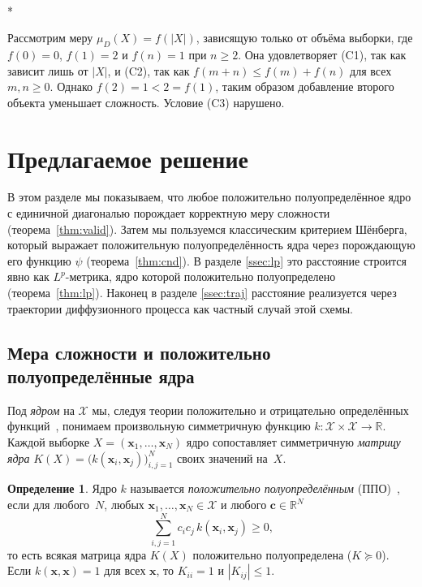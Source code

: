 \documentclass[14pt, a4paper]{extarticle}
\makeatletter
\theoremstyle{definition}
\newtheorem{definition}{Определение}[section]
\theoremstyle{plain}
\renewenvironment{proof}[1][\proofname]{\par
    \pushQED{\qed}%
    \normalfont \topsep6\p@\@plus6\p@\relax
    \trivlist
    \item[\hskip\labelsep\itshape #1\@addpunct{.}]\mbox{}\\*
    \ignorespaces
}{\popQED\endtrivlist\@endpefalse}
\makeatother
\begin{document}
\begin{proof}
Рассмотрим меру $\mu_D(X) = f(|X|)$, зависящую только от объёма выборки, где
$f(0) = 0$, $f(1) = 2$ и $f(n) = 1$ при $n \ge 2$. Она удовлетворяет (C1), так
как зависит лишь от $|X|$, и (C2), так как $f(m+n) \le f(m) + f(n)$ для всех
$m, n \ge 0$. Однако $f(2) = 1 < 2 = f(1)$, таким образом добавление второго объекта уменьшает
сложность. Условие (C3) нарушено.
\end{proof}


\section{Предлагаемое решение}
\label{sec:method}
В этом разделе мы показываем, что любое положительно
полуопределённое ядро с единичной диагональю порождает корректную меру сложности
(теорема~\ref{thm:valid}). Затем мы пользуемся классическим критерием Шёнберга,
который выражает положительную полуопределённость ядра через порождающую его
функцию $\psi$ (теорема~\ref{thm:cnd}). В разделе \ref{ssec:lp} это расстояние строится явно как $L^p$-метрика, ядро которой
положительно полуопределено (теорема~\ref{thm:lp}).
Наконец в разделе \ref{ssec:traj} расстояние реализуется через траектории диффузионного
процесса как частный случай этой схемы.

\subsection{Мера сложности и положительно полуопределённые ядра}
\label{ssec:psd}

Под \emph{ядром} на $\mathcal{X}$ мы, следуя теории положительно и отрицательно
определённых функций~\cite[гл.~3]{BergChristensenRessel1984}, понимаем
произвольную симметричную функцию $k:\mathcal{X}\times\mathcal{X}\to\mathbb{R}$. Каждой выборке $X=(\mathbf{x}_1,\dots,\mathbf{x}_N)$ ядро
сопоставляет симметричную \emph{матрицу ядра}
$K(X)=\big(k(\mathbf{x}_i,\mathbf{x}_j)\big)_{i,j=1}^N$ своих значений
на~$X$.

\begin{definition}
\label{def:psd}
Ядро $k$ называется \emph{положительно полуопределённым} (ППО)~\cite[гл.~3]{BergChristensenRessel1984},
если для любого~$N$, любых $\mathbf{x}_1,\dots,\mathbf{x}_N\in\mathcal{X}$ и любого
$\mathbf{c}\in\mathbb{R}^N$
\[
    \sum_{i,j=1}^N c_i c_j\,k(\mathbf{x}_i,\mathbf{x}_j)\ge 0,
\]
то есть всякая матрица ядра $K(X)$ положительно полуопределена ($K\succeq 0$).
Если $k(\mathbf{x},\mathbf{x})=1$ для всех $\mathbf{x}$, то $K_{ii}=1$ и
$|K_{ij}|\le 1$.
\end{definition}
\end{document}
